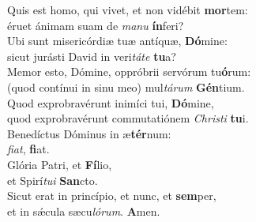 \oddverse Quis est homo, qui vivet, et non vidébit \textbf{mor}tem:~\*\\
\oddverse éruet ánimam suam de \textit{ma}\textit{nu} \textbf{ín}feri?\\
\evenverse Ubi sunt misericórdiæ tuæ antíquæ, \textbf{Dó}mine:~\*\\
\evenverse sicut jurásti David in veri\textit{tá}\textit{te} \textbf{tu}a?\\
\oddverse Memor esto, Dómine, oppróbrii servórum tu\textbf{ó}rum:~\*\\
\oddverse (quod contínui in sinu meo) mul\textit{tá}\textit{rum} \textbf{Gén}tium.\\
\evenverse Quod exprobravérunt inimíci tui, \textbf{Dó}mine,~\*\\
\evenverse quod exprobravérunt commutatiónem \textit{Chri}\textit{sti} \textbf{tu}i.\\
\oddverse Benedíctus Dóminus in æ\textbf{tér}num:~\*\\
\oddverse \textit{fi}\textit{at}, \textbf{fi}at.\\
\evenverse Glória Patri, et \textbf{Fí}lio,~\*\\
\evenverse et Spirí\textit{tu}\textit{i} \textbf{San}cto.\\
\oddverse Sicut erat in princípio, et nunc, et \textbf{sem}per,~\*\\
\oddverse et in sǽcula sæcu\textit{ló}\textit{rum}. \textbf{A}men.\\
